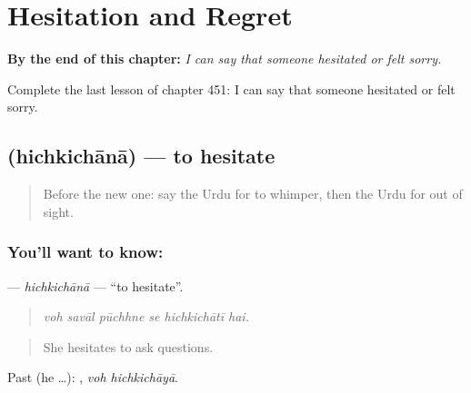 
\chapter{Hesitation and Regret}
\label{ch:ur-hesitation-and-regret}

\begin{chapteropening}
\textbf{By the end of this chapter:} \emph{I can say that someone hesitated or felt sorry.}

Complete the last lesson of chapter 451: I can say that someone hesitated or felt sorry.
\end{chapteropening}

\section[\texorpdfstring{\ur{ہچکچانا} (hichkichānā)}{ہچکچانا (hichkichānā)}]{ (hichkichānā) — to hesitate}

\label{lesson:UR-C451-hichkichana}



\begin{quote}
Before the new one: say the Urdu for to whimper, then the Urdu for out of sight.
\end{quote}

\subsection*{You'll want to know: }
\textbf{} — \emph{hichkichānā} — \textquotedblleft{}to hesitate\textquotedblright{}.

\begin{quote}
     
\end{quote}

\begin{quote}
\emph{voh savāl pūchhne se hichkichātī hai.}
\end{quote}

\begin{quote}
She hesitates to ask questions.
\end{quote}

Past (he …):  , \emph{voh hichkichāyā}.

